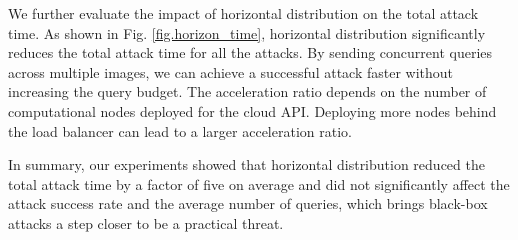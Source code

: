 We further evaluate the impact of horizontal distribution on the total attack time. As shown in Fig. \ref{fig.horizon_time}, horizontal distribution significantly reduces the total attack time for all the attacks. By sending concurrent queries across multiple images, we can achieve a successful attack faster without increasing the query budget. The acceleration ratio depends on the number of computational nodes deployed for the cloud API. Deploying more nodes behind the load balancer can lead to a larger acceleration ratio.


In summary, our experiments showed that horizontal distribution reduced the total attack time by a factor of five on average and did not significantly affect the attack success rate and the average number of queries, which brings black-box attacks a step closer to be a practical threat.



